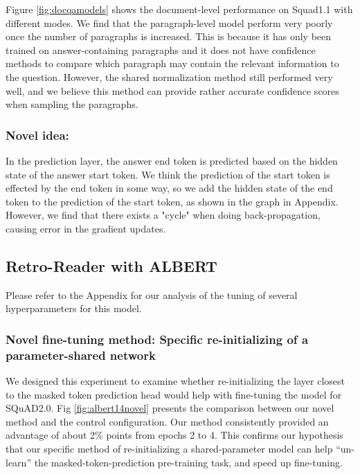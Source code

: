 \documentclass{article}
\begin{document}
Figure \ref{fig:docqamodels} shows the document-level performance on Squad1.1 with different modes. We find that the paragraph-level model perform very poorly once the number of paragraphs is increased. This is because it has only been trained on answer-containing paragraphs and it does not have confidence methods to compare which paragraph may contain the relevant information to the question. However, the shared normalization method still performed very well, and we believe this method can provide rather accurate confidence scores when sampling the paragraphs.
\subsubsection{Novel idea:}
In the prediction layer, the answer end token is predicted based on the hidden state of the answer start token. We think the prediction of the start token is effected by the end token in some way, so we add the hidden state of the end token to the prediction of the start token, as shown in the graph in Appendix. However, we find that there exists a "cycle" when doing back-propagation, causing error in the gradient updates. 







\subsection{Retro-Reader with ALBERT}

Please refer to the Appendix for our analysis of the tuning of several hyperparameters for this model.

\subsubsection{Novel fine-tuning method: Specific re-initializing of a parameter-shared network}
We designed this experiment to examine whether re-initializing the layer closest to the masked token prediction head would help with fine-tuning the model for SQuAD2.0.  Fig \ref{fig:albert14novel} presents the comparison between our novel method and the control configuration.  Our method consistently provided an advantage of about 2\% points from epochs 2 to 4.  This confirms our hypothesis that our specific method of re-initializing a shared-parameter model can help “un-learn” the masked-token-prediction pre-training task, and speed up fine-tuning.
\end{document}
